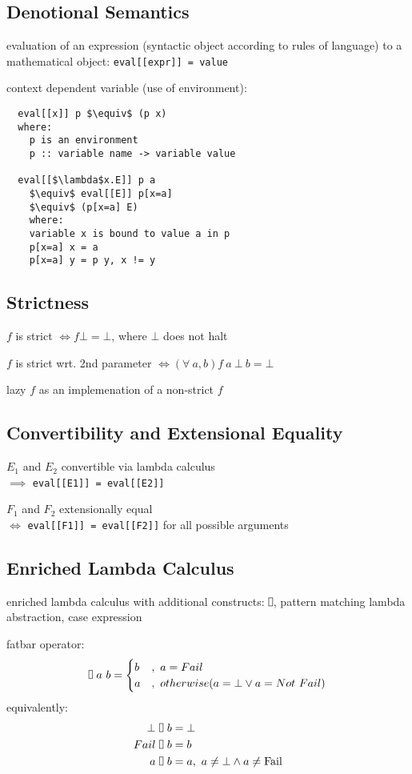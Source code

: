 \documentclass[8pt]{extarticle}
\newcommand*{\vrectangle}{{\setlength{\fboxsep}{0pt}\fbox{\phantom{l}}}}
\begin{document}
\begin{multicols*}{2}
  \subsection{Denotional Semantics}
  
  evaluation of an expression (syntactic object according to rules of language) to a mathematical object: \verb|eval[[expr]] = value|

  context dependent variable (use of environment):
\begin{lstlisting}
  eval[[x]] p $\equiv$ (p x)
  where:
    p is an environment
    p :: variable name -> variable value

  eval[[$\lambda$x.E]] p a
    $\equiv$ eval[[E]] p[x=a]
    $\equiv$ (p[x=a] E)
    where:
    variable x is bound to value a in p
    p[x=a] x = a
    p[x=a] y = p y, x != y
\end{lstlisting}
  
\subsection{Strictness}

$f$ is strict $\iff f \bot = \bot$, where $\bot$ does not halt

$f$ is strict wrt. 2nd parameter $\iff (\forall\ a, b) f\ a\ \bot\ b = \bot$

lazy $f$ as an implemenation of a non-strict $f$

\subsection{Convertibility and Extensional Equality}

$E_1$ and $E_2$ convertible via lambda calculus\\
$\implies$ \verb|eval[[E1]] = eval[[E2]]|

$F_1$ and $F_2$ extensionally equal\\
$\iff$ \verb|eval[[F1]] = eval[[F2]]| for all possible arguments

  \subsection{Enriched Lambda Calculus}
  enriched lambda calculus with additional constructs: $\vrectangle$, pattern matching lambda abstraction, case expression
  
  fatbar operator:
  \begin{align*}
    \vrectangle\ a\ b = \begin{cases}
      b&,\ a = Fail\\
      a&,\ otherwise (a=\bot \vee a=Not\ Fail)
    \end{cases}
  \end{align*}
  equivalently:
\begin{align*}
  \bot\ &\vrectangle\ b = \bot\\
  Fail\ &\vrectangle\ b = b\\
  a\ &\vrectangle\ b = a,\ a \neq \bot \wedge a \neq \text{Fail}
\end{align*}


\end{multicols*}
\end{document}
